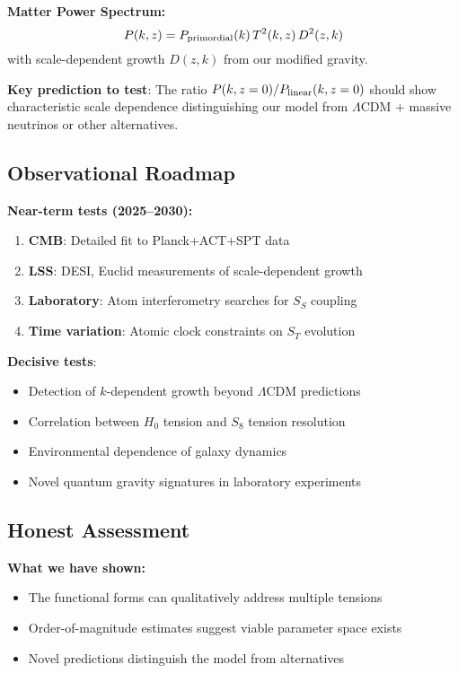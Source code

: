 \documentclass[12pt]{article}
\begin{document}
\textbf{Matter Power Spectrum:}
\begin{equation}
    P(k,z) = P_{\rm primordial}(k)\, T^2(k,z)\, D^2(z,k)
\end{equation}
with scale-dependent growth $D(z,k)$ from our modified gravity.

\textbf{Key prediction to test}: The ratio $P(k, z=0)/P_{\rm linear}(k, z=0)$ should show characteristic scale dependence distinguishing our model from $\Lambda$CDM $+$ massive neutrinos or other alternatives.

\subsection{Observational Roadmap}

\textbf{Near-term tests (2025--2030):}
\begin{enumerate}
    \item \textbf{CMB}: Detailed fit to Planck+ACT+SPT data
    \item \textbf{LSS}: DESI, Euclid measurements of scale-dependent growth
    \item \textbf{Laboratory}: Atom interferometry searches for $S_S$ coupling
    \item \textbf{Time variation}: Atomic clock constraints on $S_T$ evolution
\end{enumerate}

\textbf{Decisive tests}:
\begin{itemize}
    \item Detection of $k$-dependent growth beyond $\Lambda$CDM predictions
    \item Correlation between $H_0$ tension and $S_8$ tension resolution
    \item Environmental dependence of galaxy dynamics
    \item Novel quantum gravity signatures in laboratory experiments
\end{itemize}

\subsection{Honest Assessment}

\textbf{What we have shown:}
\begin{itemize}
    \item The functional forms can qualitatively address multiple tensions
    \item Order-of-magnitude estimates suggest viable parameter space exists
    \item Novel predictions distinguish the model from alternatives
\end{itemize}
\end{document}
